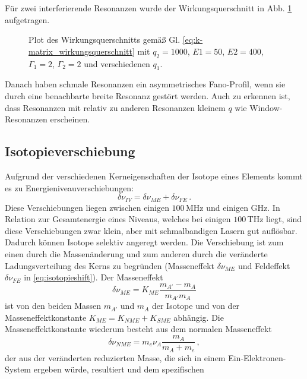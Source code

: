Für zwei interferierende Resonanzen wurde der Wirkungsquerschnitt in Abb.
\ref{fig:k-matrix_wirkungsquerschnitt} aufgetragen.
\begin{figure}
	\centering
	\footnotesize
	
	\caption[Wirkungsquerschnitt - K-Matrix Theorie]{Plot des Wirkungsquerschnitts
	gemäß Gl. \eqref{eq:k-matrix_wirkungsquerschnitt} mit $q_2=1000$, $E1=50$,
	$E2=400$, $\Gamma_1=2$, $\Gamma_2=2$ und verschiedenen $q_1$.}
	\label{fig:k-matrix_wirkungsquerschnitt}
\end{figure}
Danach haben schmale Resonanzen ein asymmetrisches Fano-Profil, wenn sie durch
eine benachbarte breite Resonanz gestört werden. Auch zu erkennen ist, dass
Resonanzen mit relativ zu anderen Resonanzen kleinem $q$ wie Window-Resonanzen
erscheinen.

\subsection{Isotopieverschiebung}\label{subsec:isotopieverschiebung}
Aufgrund der verschiedenen Kerneigenschaften der Isotope eines Elements kommt es
zu Energieniveauverschiebungen:
\begin{equation}\label{eq:isotopieshift}
	\delta\nu_{IV}=\delta\nu_{ME}+\delta\nu_{FE}\,.
\end{equation}
Diese Verschiebungen liegen zwischen einigen $100\,$MHz und einigen GHz. In
Relation zur Gesamtenergie eines Niveaus, welches bei einigen $100\,$THz liegt,
sind diese Verschiebungen zwar klein, aber mit schmalbandigen Lasern gut
auflösbar. Dadurch können Isotope selektiv angeregt werden.
Die Verschiebung ist zum einen durch die Massenänderung und zum anderen durch die veränderte Ladungsverteilung des Kerns zu begründen (Masseneffekt $\delta\nu_{ME}$ und Feldeffekt $\delta\nu_{FE}$ in \eqref{eq:isotopieshift}). Der Masseneffekt
\begin{equation}\label{eq:masseneffekt}
	\delta\nu_{ME}=K_{ME}\frac{m_{A'}-m_A}{m_{A'}m_A}
\end{equation}
ist von den beiden Massen $m_{A'}$ und $m_A$ der Isotope und von der
Masseneffektkonstante $K_{ME}=K_{NME}+K_{SME}$ abhängig. Die
Masseneffektkonstante wiederum besteht aus dem normalen Masseneffekt
\begin{equation}\label{eq:normaler_masseneffekt}
	\delta\nu_{NME}=m_e\nu_A\frac{m_A}{m_A+m_e}\,,
\end{equation}
der aus der veränderten reduzierten Masse, die sich in einem
Ein-Elektronen-System ergeben würde, resultiert und dem spezifischen
